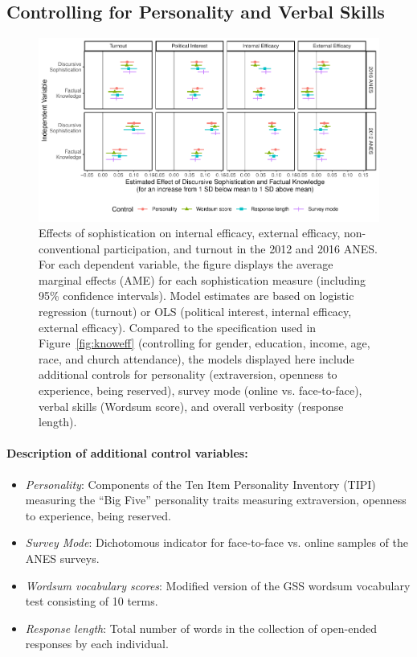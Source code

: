 \clearpage
\subsection{Controlling for Personality and Verbal Skills}\label{app:personality}

\begin{figure}[h]\centering
	\includegraphics{../fig/knoweff_robust.pdf}
	\caption{Effects of sophistication on internal efficacy, external efficacy, non-conventional participation, and turnout in the 2012 and 2016 ANES. For each dependent variable, the figure displays the average marginal effects (AME) for each sophistication measure (including 95\% confidence intervals). Model estimates are based on logistic regression (turnout) or OLS (political interest, internal efficacy, external efficacy). Compared to the specification used in Figure~\ref{fig:knoweff} (controlling for gender, education, income, age, race, and church attendance), the models displayed here include additional controls for personality (extraversion, openness to experience, being reserved), survey mode (online vs. face-to-face), verbal skills (Wordsum score), and overall verbosity (response length).%
	}\label{fig:knoweff_robust}
\end{figure}

\vspace{1em}

\paragraph{Description of additional control variables:}

\begin{itemize}
	\item \textit{Personality}: Components of the Ten Item Personality Inventory (TIPI) measuring the ``Big Five'' personality traits measuring extraversion, openness to experience, being reserved.
	\item \textit{Survey Mode}: Dichotomous indicator for face-to-face vs. online samples of the ANES surveys.
	\item \textit{Wordsum vocabulary scores}: Modified version of the GSS wordsum vocabulary test consisting of 10 terms.
	\item \textit{Response length}: Total number of words in the collection of open-ended responses by each individual.
\end{itemize}

